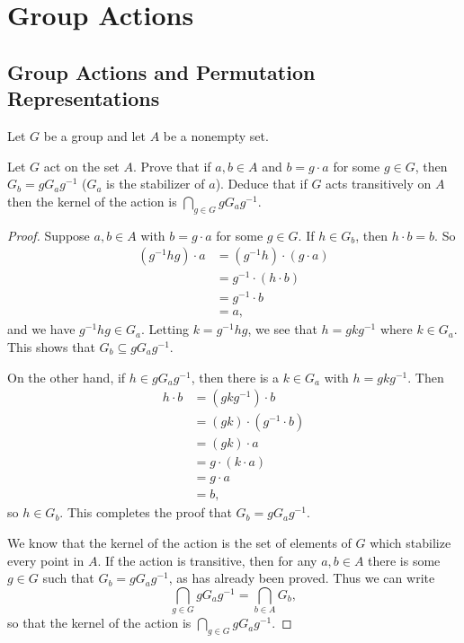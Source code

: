 \chapter{Group Actions}

\section{Group Actions and Permutation Representations}

Let $G$ be a group and let $A$ be a nonempty set.

 Let $G$ act on the set $A$. Prove that if $a,b\in A$ and
$b = g\cdot a$ for some $g\in G$, then $G_b = gG_ag^{-1}$ ($G_a$ is
the stabilizer of $a$). Deduce that if $G$ acts transitively on $A$
then the kernel of the action is $\bigcap_{g\in G} gG_ag^{-1}$.
\begin{proof}
  Suppose $a,b\in A$ with $b = g\cdot a$ for some $g\in G$. If
  $h\in G_b$, then $h\cdot b = b$. So
  \begin{align*}
    (g^{-1}hg)\cdot a
    &= (g^{-1}h)\cdot(g\cdot a) \\
    &= g^{-1}\cdot(h\cdot b) \\
    &= g^{-1}\cdot b \\
    &= a,
  \end{align*}
  and we have $g^{-1}hg\in G_a$. Letting $k = g^{-1}hg$, we see that
  $h = gkg^{-1}$ where $k\in G_a$. This shows that
  $G_b\subseteq gG_ag^{-1}$.

  On the other hand, if $h\in gG_ag^{-1}$, then there is a $k\in G_a$
  with $h = gkg^{-1}$. Then
  \begin{align*}
    h\cdot b
    &= (gkg^{-1})\cdot b \\
    &= (gk)\cdot(g^{-1}\cdot b) \\
    &= (gk)\cdot a \\
    &= g\cdot(k\cdot a) \\
    &= g\cdot a \\
    &= b,
  \end{align*}
  so $h\in G_b$. This completes the proof that $G_b = gG_ag^{-1}$.

  We know that the kernel of the action is the set of elements of $G$
  which stabilize every point in $A$. If the action is transitive,
  then for any $a,b\in A$ there is some $g\in G$ such that
  $G_b = gG_ag^{-1}$, as has already been proved. Thus we can write
  \begin{equation*}
    \bigcap_{g\in G}gG_ag^{-1} = \bigcap_{b\in A}G_b,
  \end{equation*}
  so that the kernel of the action is $\bigcap_{g\in G}gG_ag^{-1}$.
\end{proof}
